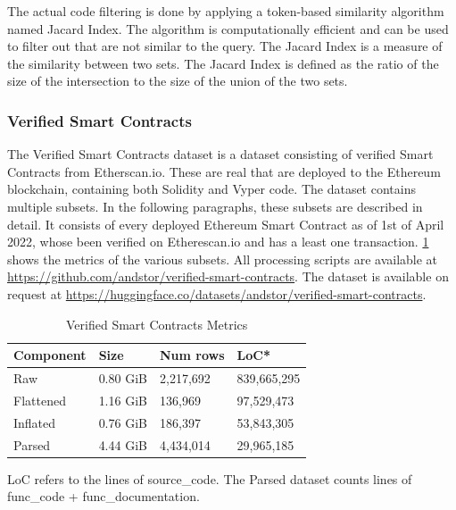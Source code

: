 The actual code filtering is done by applying a token-based similarity algorithm named Jacard Index. The algorithm is computationally efficient and can be used to filter out  that are not similar to the query. The Jacard Index is a measure of the similarity between two sets. The Jacard Index is defined as the ratio of the size of the intersection to the size of the union of the two sets.

\subsubsection{Verified Smart Contracts}
\label{sec:verified-smart-contracts}
The Verified Smart Contracts dataset is a dataset consisting of verified Smart Contracts from Etherscan.io. These are real  that are deployed to the Ethereum blockchain, containing both Solidity and Vyper code. The dataset contains multiple subsets. In the following paragraphs, these subsets are described in detail. It consists of every deployed Ethereum Smart Contract as of 1st of April 2022, whose been verified on Etherescan.io and has a least one transaction. \cref{tab:verified-smart-contracts-metrics} shows the metrics of the various subsets. All processing scripts are available at \url{https://github.com/andstor/verified-smart-contracts}. The dataset is available on request at \url{https://huggingface.co/datasets/andstor/verified-smart-contracts}.

\begin{table}
    \def\arraystretch{1.5}
    \small
    \centering
    \caption{Verified Smart Contracts Metrics}
    \label{tab:verified-smart-contracts-metrics}
    \begin{tabularx}{\textwidth}{XXXX}
        \toprule
        \textbf{Component} & \textbf{Size} &  \textbf{Num rows} & \textbf{LoC*}\\
        \midrule
        Raw & 0.80 GiB & 2,217,692 & 839,665,295\\
        Flattened & 1.16 GiB & 136,969 & 97,529,473\\
        Inflated & 0.76 GiB & 186,397 & 53,843,305\\
        Parsed & 4.44 GiB & 4,434,014 & 29,965,185\\
        \bottomrule
    \end{tabularx}
\end{table}
LoC refers to the lines of source\_code. The Parsed dataset counts lines of func\_code + func\_documentation.

